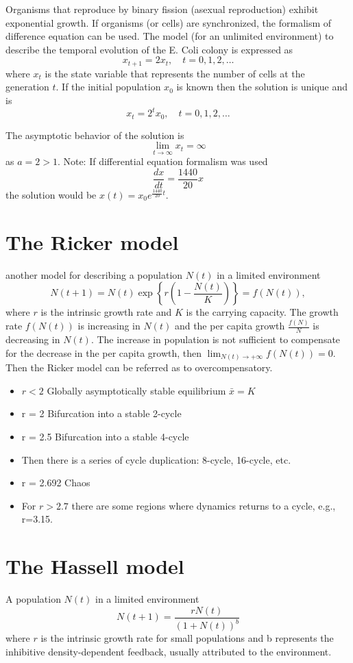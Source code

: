 Organisms that reproduce by binary fission (asexual reproduction) exhibit exponential growth. If organisms (or cells) are synchronized, the formalism of difference equation can be used.
The model (for an unlimited environment) to describe the temporal evolution of the E. Coli colony is expressed as
$$x_{t+1}=2x_t, \quad t=0,1,2,\dots$$
where $x_t$ is the state variable that represents the number of cells at the generation $t$. If the initial population $x_0$ is known then the solution is unique and is 
$$x_{t}=2^tx_0, \quad t=0,1,2,\dots$$

The asymptotic behavior of the solution is
$$\lim_{t\rightarrow \infty} x_t=\infty$$
as $a=2>1$. 
Note: If differential equation formalism was used
$$\frac{dx}{dt}=\frac{1440}{20}x$$
the solution would be $x(t)=x_0e^{\frac{1440}{20}t}$.



\section{The Ricker model}
another model for describing a population $N(t)$ in a limited environment
$$N(t+1)=N(t)\exp\left\{r\left(1-\frac{N(t)}{K}\right) \right\}=f(N(t)),$$
where $r$ is the intrinsic growth rate and $K$ is the carrying capacity. The growth rate $f(N(t))$ is increasing  in $N(t)$ and the per capita growth $\frac{f(N)}{N}$ is decreasing in $N(t)$. The increase in population is not sufficient to compensate for the decrease in the per capita growth, then $\lim_{N(t)\rightarrow +\infty}f(N(t))=0$. Then the Ricker model can be referred as to overcompensatory.
\begin{itemize}
\item $r < 2$ Globally asymptotically stable equilibrium $\bar x=K$
\item r = 2 Bifurcation into a stable 2-cycle
\item r = 2.5 Bifurcation into a stable 4-cycle
\item Then there is a series of cycle duplication: 8-cycle, 16-cycle, etc.
\item r = 2.692 Chaos 
\item For $r > 2.7$ there are some regions where dynamics returns to a cycle, e.g., r=3.15. 
\end{itemize}



\section{The Hassell model}
A population $N(t)$ in a limited environment
$$N(t+1)=\frac{rN(t)}{(1 + N(t))^b}$$
where $r$ is the intrinsic growth rate for small populations and b represents the inhibitive density-dependent feedback, usually attributed to the environment. 



